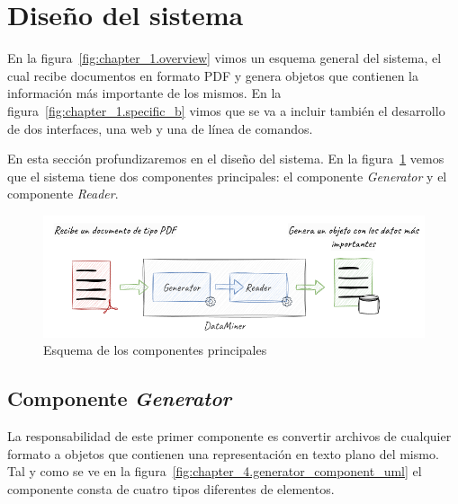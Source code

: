 \section{Diseño del sistema}

En la figura~\ref{fig:chapter_1.overview} vimos un esquema general del sistema, el cual recibe documentos en formato
PDF y genera objetos que contienen la información más importante de los mismos.
En la figura~\ref{fig:chapter_1.specific_b} vimos que se va a incluir también el desarrollo de dos interfaces, una web
y una de línea de comandos.

En esta sección profundizaremos en el diseño del sistema.
En la figura~\ref{fig:chapter_4.overview} vemos que el sistema tiene dos componentes principales: el componente
\textit{Generator} y el componente \textit{Reader}.

\begin{figure}[ht]
    \begin{center}
        \includegraphics[width=\textwidth]{./chapter/4/images/chapter_4.overview}
        \caption{Esquema de los componentes principales}
        \label{fig:chapter_4.overview}
    \end{center}
\end{figure}

\subsection*{Componente \textit{Generator}}\label{subsec:chapter_4.generator_component}

La responsabilidad de este primer componente es convertir archivos de cualquier formato a objetos que contienen una
representación en texto plano del mismo.
Tal y como se ve en la figura~\ref{fig:chapter_4.generator_component_uml} el componente consta de cuatro tipos
diferentes de elementos.

